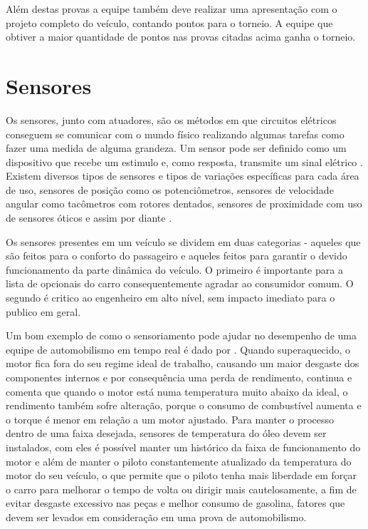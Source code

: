 Além destas provas a equipe também deve realizar uma apresentação com o projeto completo do veículo, contando pontos para o torneio. A equipe que obtiver a maior quantidade de pontos nas provas citadas acima ganha o torneio.

\section{Sensores}
\label{sec:sensores}
Os sensores, junto com atuadores, são os métodos em que circuitos elétricos conseguem se comunicar com o mundo físico realizando algumas tarefas como fazer uma medida de alguma grandeza. Um sensor pode ser definido como um dispositivo que recebe um estimulo e, como resposta, transmite um sinal elétrico \cite{Fraden2016}. Existem diversos tipos de sensores e tipos de variações específicas para cada área de uso, sensores de posição como os potenciômetros, sensores de velocidade angular como tacômetros com rotores dentados, sensores de proximidade com uso de sensores óticos e assim por diante \cite{kilian2001modern}. 

Os sensores presentes em um veículo se dividem em duas categorias \cite{vehicleDataAcquisition2014} - aqueles que são feitos para o conforto do passageiro e aqueles feitos para garantir o devido funcionamento da parte dinâmica do veículo. O primeiro é importante para a lista de opcionais do carro consequentemente agradar ao consumidor comum. O segundo é critico ao engenheiro em alto nível, sem impacto imediato para o publico em geral.

Um bom exemplo de como o sensoriamento pode ajudar no desempenho de uma equipe de automobilismo em tempo real é dado por . Quando superaquecido, o motor fica fora do seu regime ideal de trabalho, causando um maior desgaste dos componentes internos e por consequência uma perda de rendimento,  continua e comenta que quando o motor está numa temperatura muito abaixo da ideal, o rendimento também sofre alteração, porque o consumo de combustível aumenta e o torque é menor em relação a um motor ajustado. Para manter o processo dentro de uma faixa desejada, sensores de temperatura do óleo devem ser instalados, com eles é possível manter um histórico da faixa de funcionamento do motor e além de manter o piloto constantemente atualizado da temperatura do motor do seu veículo, o que permite que o piloto tenha mais liberdade em forçar o carro para melhorar o tempo de volta ou dirigir mais cautelosamente, a fim de evitar desgaste excessivo nas peças e melhor consumo de gasolina, fatores que devem ser levados em consideração em uma prova de automobilismo. 

